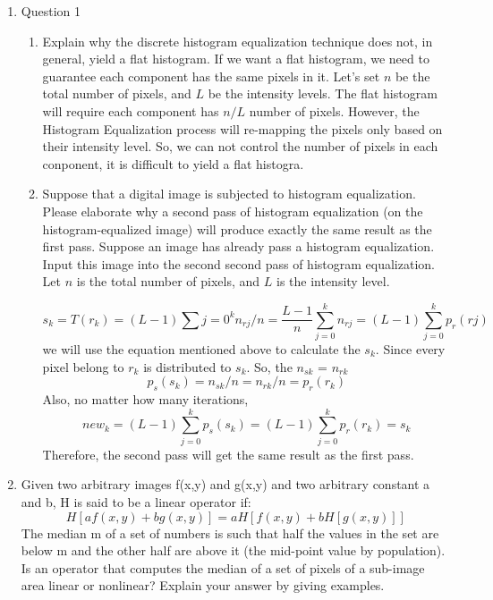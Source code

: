\documentclass[12pt]{article}
\begin{document}
\begin{enumerate}[leftmargin=\labelsep]
\item Question 1
    \begin{enumerate}
    \item  Explain why the discrete histogram equalization technique does not, in general, yield a flat histogram.
    \vspace*{1em}
    If we want a flat histogram, we need to guarantee each component has the same pixels in it. 
    Let's set $n$ be the total number of pixels, and $L$ be the intensity levels. 
    The flat histogram will require each component has $n/L$ number of pixels. 
    However, the Histogram Equalization process will re-mapping the pixels only based on their intensity level.
    So, we can not control the number of pixels in each conponent, it is difficult to yield a flat histogra. 
    
    \item Suppose that a digital image is subjected to histogram equalization. Please elaborate why a second pass of histogram equalization (on the histogram-equalized image) will produce exactly the same result as the first pass.
    \vspace*{1em}
    Suppose an image has already pass a histogram equalization. 
    Input this image into the second second pass of histogram equalization. 
    Let $n$ is the total number of pixels, and $L$ is the intensity level.

        $$
        s_k = T(r_k) = (L-1)\sum{j=0}^k n_{rj}/n = \frac{L-1}{n} \sum_{j=0}^k n_{rj} = (L-1)\sum_{j = 0}^k p_r(rj)
        $$
        we will use the equation mentioned above to calculate the $s_k$.
        Since every pixel belong to $r_k$ is distributed to $s_k$.
        So, the $n_{sk}$ = $n_{rk}$
        $$
        p_s(s_k) = n_{sk} / n = n_{rk} / n = p_r(r_k)
        $$
        Also, no matter how many iterations,
        $$
        new_k = (L-1)\sum_{j=0}^k p_s(s_k) = (L-1)\sum_{j=0}^k p_r(r_k) = s_k
        $$
        Therefore, the second pass will get the same result as the first pass. 

    \end{enumerate}


\item Given two arbitrary images f(x,y) and g(x,y) and two arbitrary constant a and b, H is said to be a linear operator if:
$$
        H[af(x, y) + bg(x, y)] = aH[f(x,y) + bH[g(x,y)]]
$$
The median m of a set of numbers is such that half the values in the set are below m and the other half are above it (the mid-point value by population). Is an operator that computes the median of a set of pixels of a sub-image area linear or nonlinear? Explain your answer by giving examples.


\end{enumerate}
\end{document}

